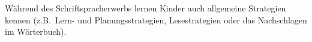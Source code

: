 Während des Schriftspracherwerbs lernen Kinder auch allgemeine Strategien kennen (z.B.\ Lern- und Planungsstrategien, Lesestrategien oder das Nachschlagen im Wörterbuch).